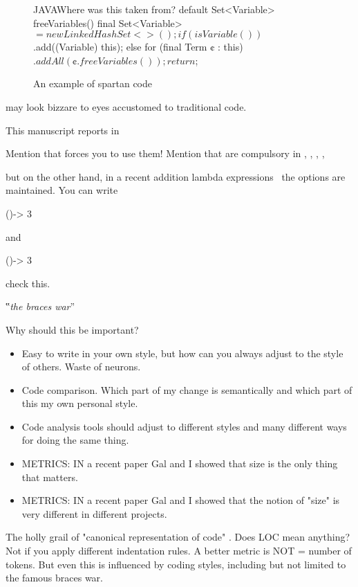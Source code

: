 \begin{figure}[h]
  \begin{Code}{JAVA}{Where was this taken from?}
default Set<Variable> freeVariables() {
    final Set<Variable> $ = new LinkedHashSet<>();
    if (isVariable())
      $.add((Variable) this);
    else
      for (final Term ¢ : this)
        $.addAll(¢.freeVariables());
    return $;
  }
\end{Code}
\label{figure:shock-3}
\caption{An example of spartan code}
\end{figure}

may look bizzare to eyes accustomed to traditional \Java code.

This manuscript reports in

Mention that \Go forces you to use them!
Mention that are compulsory in ,
,
,
,

but on the other hand, in a recent addition lambda expressions~\cite{lambda}
the options are maintained.
You can write
\begin{JAVA}
()-> 3
\end{JAVA}
and
\begin{JAVA}
  ()-> {3}
\end{JAVA}
check this.

‟\emph{the braces war}”

Why should this be important?
\begin{itemize}
    \item Easy to write in your own style, but how can
      you always adjust to the style of others.
      Waste of neurons.
    \item Code comparison. Which part of my change is semantically and which
      part of this my own personal style.
    \item Code analysis tools should adjust to different styles and many
        different ways for doing the same thing.
    \item METRICS: IN a recent paper Gal and I showed that size
      is the only thing that matters.
    \item METRICS: IN a recent paper Gal and I showed that the notion of
      "size" is very different in different projects.
\end{itemize}

The holly grail of "canonical representation of code" .
Does LOC mean anything?
Not if you apply different indentation rules.
A better metric is NOT = number of tokens.
But even this is influenced by coding styles, including but
not limited to the famous braces war.

